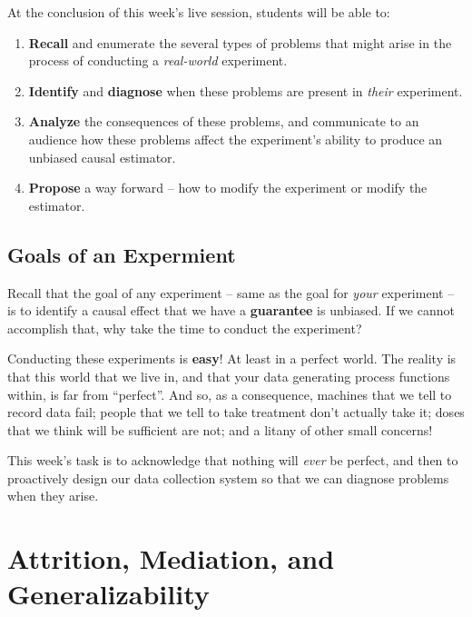 \documentclass[
]{article}
\providecommand{\tightlist}{%
  \setlength{\itemsep}{0pt}\setlength{\parskip}{0pt}}
\begin{document}
At the conclusion of this week's live session, students will be able to:

\begin{enumerate}
\def\labelenumi{\arabic{enumi}.}
\tightlist
\item
  \textbf{Recall} and enumerate the several types of problems that might arise in the process of conducting a \emph{real-world} experiment.
\item
  \textbf{Identify} and \textbf{diagnose} when these problems are present in \emph{their} experiment.
\item
  \textbf{Analyze} the consequences of these problems, and communicate to an audience how these problems affect the experiment's ability to produce an unbiased causal estimator.
\item
  \textbf{Propose} a way forward -- how to modify the experiment or modify the estimator.
\end{enumerate}

\hypertarget{goals-of-an-expermient}{%
\subsection{Goals of an Expermient}\label{goals-of-an-expermient}}

Recall that the goal of any experiment -- same as the goal for \emph{your} experiment -- is to identify a causal effect that we have a \textbf{guarantee} is unbiased. If we cannot accomplish that, why take the time to conduct the experiment?

Conducting these experiments is \textbf{easy}! At least in a perfect world. The reality is that this world that we live in, and that your data generating process functions within, is far from ``perfect''. And so, as a consequence, machines that we tell to record data fail; people that we tell to take treatment don't actually take it; doses that we think will be sufficient are not; and a litany of other small concerns!

This week's task is to acknowledge that nothing will \emph{ever} be perfect, and then to proactively design our data collection system so that we can diagnose problems when they arise.

\hypertarget{attrition-mediation-and-generalizability}{%
\section{Attrition, Mediation, and Generalizability}\label{attrition-mediation-and-generalizability}}
\end{document}
